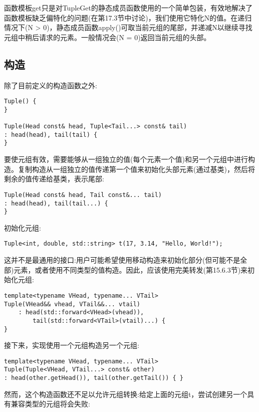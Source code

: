 函数模板get只是对TupleGet的静态成员函数使用的一个简单包装，有效地解决了函数模板缺乏偏特化的问题(在第17.3节中讨论)，我们使用它特化N的值。在递归情况下(N > 0)，静态成员函数apply()可取当前元组的尾部，并递减N以继续寻找元组中稍后请求的元素。一般情况会(N = 0)返回当前元组的头部。

\subsection{构造}

除了目前定义的构造函数之外:

\begin{lstlisting}[style=styleCXX]
Tuple() {
}

Tuple(Head const& head, Tuple<Tail...> const& tail)
: head(head), tail(tail) {
}
\end{lstlisting}

要使元组有效，需要能够从一组独立的值(每个元素一个值)和另一个元组中进行构造。复制构造从一组独立的值传递第一个值来初始化头部元素(通过基类)，然后将剩余的值传递给基类，表示尾部:

\begin{lstlisting}[style=styleCXX]
Tuple(Head const& head, Tail const&... tail)
: head(head), tail(tail...) {
}
\end{lstlisting}

初始化元组:

\begin{lstlisting}[style=styleCXX]
Tuple<int, double, std::string> t(17, 3.14, "Hello, World!");
\end{lstlisting}

这并不是最通用的接口:用户可能希望使用移动构造来初始化部分(但可能不是全部)元素，或者使用不同类型的值构造。因此，应该使用完美转发(第15.6.3节)来初始化元组:

\begin{lstlisting}[style=styleCXX]
template<typename VHead, typename... VTail>
Tuple(VHead&& vhead, VTail&&... vtail)
	: head(std::forward<VHead>(vhead)),
		tail(std::forward<VTail>(vtail)...) {
}
\end{lstlisting}

接下来，实现使用一个元组构造另一个元组:

\begin{lstlisting}[style=styleCXX]
template<typename VHead, typename... VTail>
Tuple(Tuple<VHead, VTail...> const& other)
: head(other.getHead()), tail(other.getTail()) { }
\end{lstlisting}

然而，这个构造函数还不足以允许元组转换:给定上面的元组t，尝试创建另一个具有兼容类型的元组将会失败:

